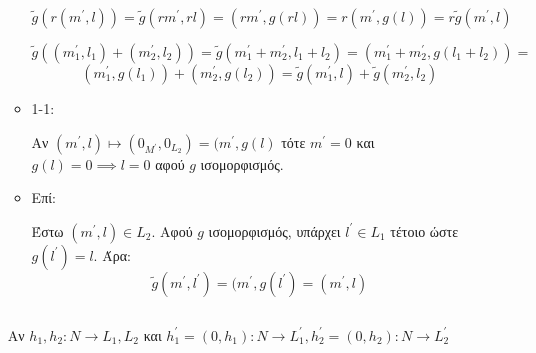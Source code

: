 \documentclass{article}
\begin{document}
\begin{enumerate}
\begin{itemize}
			$$\widetilde{g} \left( r\left( m^{\prime}, l \right) \right) = \widetilde{g} \left( rm^{\prime} , rl \right)  = \left( rm^{\prime}, g\left( rl \right)  \right) = r \left( m^{\prime}, g(l) \right) =  r\widetilde{g}\left( m^{\prime} , l \right)   $$

			$$ \widetilde{g} \left( (m^{\prime}_1 , l_1 ) + (m^{\prime}_2, l_2 ) \right) = \widetilde{g} \left( m^{\prime}_1 + m^{\prime}_2 , l_1 + l_2  \right) = \left( m^{\prime}_1 + m^{\prime}_2 , g(l_1 + l_2) \right) = $$
		$$	\left( m^{\prime}_1, g(l_1 ) \right) + \left( m^{\prime}_2 , g(l_2 ) \right)  = \widetilde{g} \left( m^{\prime}_1, l \right) + \widetilde{g} \left( m^{\prime}_2 , l_2 \right)   $$
		$ $\newline
		
	\item 1-1:

		Αν $(m^{\prime}, l) \mapsto (0_{M^{\prime}} , 0_{L_2}) = (m^{\prime}, g(l)$ τότε $m^{\prime}=0$ και $g(l) = 0 \implies l = 0$ αφού $g$ ισομορφισμός.
$ $\newline

	\item Επί:

		Έστω $(m^{\prime}, l) \in L_2$. Αφού $g$ ισομορφισμός, υπάρχει $l^{\prime} \in L_1$ τέτοιο ώστε $g(l^{\prime}) = l$. Άρα:
		$$\widetilde{g} (m^{\prime}, l^{\prime} ) = (m^{\prime}, g(l^{\prime}) = (m^{\prime}, l)$$


			\end{itemize}
$ $\newline

			Αν $h_1 , h_2 : N \rightarrow L_1 , L_2 $ και $h^{\prime}_1 = (0, h_1) : N \rightarrow L^{\prime}_1, h^{\prime}_2 = (0,h_2) : N \rightarrow L^{\prime}_2$


\end{enumerate}
\end{document}
